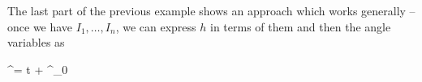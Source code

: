 \documentclass[main.tex]{subfiles}
\begin{document}
\begin{remark}
	The last part of the previous example shows an approach which works generally -- once we have $I_1, \ldots, I_n$, we can express $h$ in terms of them and then the angle variables as
	\begin{eqalign}
		\phi^\alpha =  t + \phi^\alpha_0
	\end{eqalign}
\end{remark}
\end{document}
